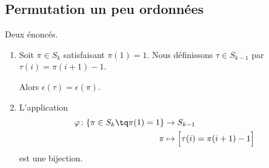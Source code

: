 \subsection{Permutation un peu ordonnées}

\begin{lemma}		\label{LEMooEOTGooPslULz}
	Deux énoncés.
	\begin{enumerate}
		\item		\label{ITEMooQZDRooUYjcgX}
		      Soit \( \pi\in S_k\) satisfaisant \( \pi(1)=1\). Nous définissons \( \tau\in S_{k-1}\) par \( \tau(i)=\pi(i+1)-1 \).

		      Alors \( \epsilon(\tau)=\epsilon(\pi)\).
		\item		\label{ITEMooBUGZooVCVhKz}
		      L'application
		      \begin{equation}
			      \begin{aligned}
				      \varphi\colon \{ \pi\in S_k\tq \pi(1)=1 \} & \to S_{k-1}                             \\
				      \pi                                        & \mapsto \Big[  \tau(i)=\pi(i+1)-1 \Big]
			      \end{aligned}
		      \end{equation}
		      est une bijection.
	\end{enumerate}
\end{lemma}

